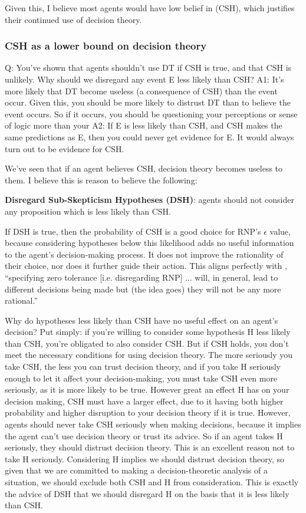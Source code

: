 \documentclass{article}
\begin{document}
Given this, I believe most agents would have low belief in (CSH), which justifies their continued use of decision theory.

\subsubsection{CSH as a lower bound on decision theory}

Q: You've shown that agents shouldn't use DT if CSH is true, and that CSH is unlikely. Why should we disregard any event E less likely than CSH?
A1: It's more likely that DT become useless (a consequence of CSH) than the event occur. Given this, you should be more likely to distrust DT than to believe the event occurs. So if it occurs, you should be questioning your perceptions or sense of logic more than your 
A2: If E is less likely than CSH, and CSH makes the same predictions as E, then you could never get evidence for E. It would always turn out to be evidence for CSH.

We've seen that if an agent believes CSH, decision theory becomes useless to them. I believe this is reason to believe the following:

\textbf{Disregard Sub-Skepticism Hypotheses (DSH)}: agents should not consider any proposition which is less likely than CSH.

If DSH is true, then the probability of CSH is a good choice for RNP's \(\epsilon\) value, because considering hypotheses below this likelihood adds no useful information to the agent's decision-making process. It does not improve the rationality of their choice, nor does it further guide their action. This aligns perfectly with \citep[pg. 475]{smith2014evaluative}, ``specifying zero tolerance [i.e. disregarding RNP] ... will, in general, lead to different decisions being made \textemdash{} but (the idea goes) they will not be any more rational.''

Why do hypotheses less likely than CSH have no useful effect on an agent's decision? Put simply: if you're willing to consider some hypothesis H less likely than CSH, you're obligated to also consider CSH. But if CSH holds, you don't meet the necessary conditions for using decision theory. The more seriously you take CSH, the less you can trust decision theory, and if you take H seriously enough to let it affect your decision-making, you must take CSH even more seriously, as it is more likely to be true. However great an effect H has on your decision making, CSH must have a larger effect, due to it having both higher probability and higher disruption to your decision theory if it is true. However, agents should never take CSH seriously when making decisions, because it implies the agent can't use decision theory or trust its advice. So if an agent takes H seriously, they should distrust decision theory. This is an excellent reason not to take H seriously. Considering H implies we should distrust decision theory, so given that we are committed to making a decision-theoretic analysis of a situation, we should exclude both CSH and H from consideration. This is exactly the advice of DSH \textemdash{} that we should disregard H on the basis that it is less likely than CSH. 
\end{document}
